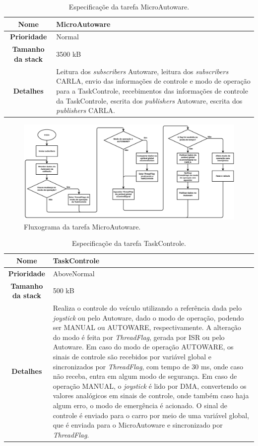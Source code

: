 \begin{table}
	\centering
	\begin{tabular}{c|p{11.5cm}}
		\textbf{Nome} & MicroAutoware \\
		\hline
		\textbf{Prioridade}& Normal \\
		\hline
		\textbf{Tamanho da stack} & 3500 kB \\
		\hline
		\textbf{Detalhes} & Leitura dos \textit{subscribers} Autoware, leitura dos \textit{subscribers} CARLA, envio das informações de controle e modo de operação para a TaskControle, recebimentos das informações de controle da TaskControle, escrita dos \textit{publishers} Autoware, escrita dos \textit{publishers} CARLA. \\
	\end{tabular}
	\caption{Especificaçõe da tarefa MicroAutoware.}
	\label{tab:microautoware}
\end{table}

\begin{figure}[H]
	\centering
	\includegraphics[width = \textwidth]{img/fluxograma_microautoware}
	\caption{Fluxograma da tarefa MicroAutoware.}
	\label{fig:fluxograma_microautoware}
\end{figure}

\begin{table}
	\centering
	\begin{tabular}{c|p{11.5cm}}
	\textbf{Nome} & TaskControle \\
	\hline
	\textbf{Prioridade}& AboveNormal \\
	\hline
	\textbf{Tamanho da stack} & 500 kB \\
	\hline
	\textbf{Detalhes} & Realiza o controle do veículo utilizando a referência dada pelo \textit{joystick} ou pelo Autoware, dado o modo de operação, podendo ser MANUAL ou AUTOWARE, respectivamente. A alteração do modo é feita por \textit{ThreadFlag}, gerada por ISR ou pelo Autoware. Em caso do modo de operação AUTOWARE, os sinais de controle são recebidos por variável global e sincronizados por \textit{ThreadFlag}, com tempo de 30 ms, onde caso não receba, entra em algum modo de segurança. Em caso de operação MANUAL,  o \textit{joystick} é lido por DMA, convertendo os valores analógicos em sinais de controle, onde também caso haja algum erro, o modo de emergência é acionado. O sinal de controle é enviado para o carro por meio de uma variável global, que é enviada para o MicroAutoware e sincronizado por \textit{ThreadFlag}. \\
	\end{tabular}
	\caption{Especificaçõe da tarefa TaskControle.}
	\label{tab:taskcontrole}
\end{table}

